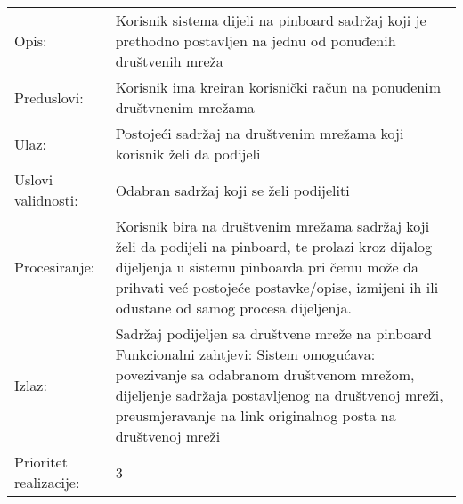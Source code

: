 \begin{tabu} to 1.2
Opis: & Korisnik sistema dijeli na pinboard sadržaj koji je prethodno postavljen na jednu od ponuđenih društvenih mreža \\
Preduslovi: & Korisnik ima kreiran korisnički račun na ponuđenim društvnenim mrežama \\
Ulaz: & Postojeći sadržaj na društvenim mrežama koji korisnik želi da podijeli \\
Uslovi validnosti: & Odabran sadržaj koji se želi podijeliti \\
Procesiranje: & Korisnik bira na društvenim mrežama sadržaj koji želi da podijeli na pinboard, te prolazi kroz dijalog dijeljenja u sistemu pinboarda pri čemu može da prihvati već postojeće postavke/opise, izmijeni ih ili odustane od samog procesa dijeljenja. \\
Izlaz: & Sadržaj podijeljen sa društvene mreže na pinboard
Funkcionalni zahtjevi: Sistem omogućava: povezivanje sa odabranom društvenom mrežom, dijeljenje sadržaja postavljenog na društvenoj mreži, preusmjeravanje na link originalnog posta na društvenoj mreži \\
Prioritet realizacije: & 3

\end{tabu}
\newpage